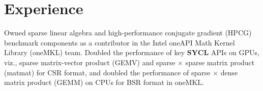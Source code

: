 \documentclass[letterpaper,10pt]{article}
\begin{document}
\vspace{225.95pt}


%
%
%
%


\vspace{-2pt}
\section{Experience}
  \resumeSubHeadingListStart


        \resumeItemListStart
            {Owned sparse linear algebra and high-performance conjugate gradient
            (HPCG) benchmark components as a contributor in the
            Intel\textsuperscript{\scriptsize{\textregistered}} oneAPI Math
            Kernel Library (oneMKL) team.}
            {Doubled the performance of key \textbf{SYCL} APIs on GPUs, viz.,
            sparse matrix-vector product (GEMV) and sparse $\times$ sparse
            matrix product (matmat) for CSR format, and doubled the
            performance of sparse $\times$ dense matrix product (GEMM) on CPUs
            for BSR format in oneMKL.}
        \resumeItemListEnd
\end{document}
